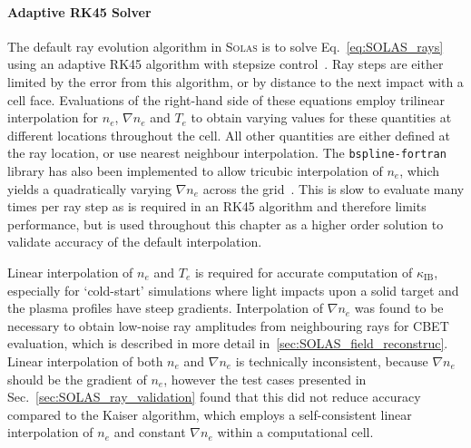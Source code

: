 \paragraph*{Adaptive RK45 Solver}
The default ray evolution algorithm in \textsc{Solas} is to solve Eq.~\ref{eq:SOLAS_rays} using an adaptive RK45 algorithm with stepsize control~\cite{press_numerical_2007}.
Ray steps are either limited by the error from this algorithm, or by distance to the next impact with a cell face.
Evaluations of the right-hand side of these equations employ trilinear interpolation for $n_e$, $\nabla n_e$ and $T_e$ to obtain varying values for these quantities at different locations throughout the cell.
All other quantities are either defined at the ray location, or use nearest neighbour interpolation.
The \texttt{bspline-fortran} library has also been implemented to allow tricubic interpolation of $n_e$, which yields a quadratically varying $\nabla n_e$ across the grid~\cite{williams_bspline-fortran_2024}.
This is slow to evaluate many times per ray step as is required in an RK45 algorithm and therefore limits performance, but is used throughout this chapter as a higher order solution to validate accuracy of the default interpolation.

Linear interpolation of $n_e$ and $T_e$ is required for accurate computation of $\kappa_{\text{IB}}$, especially for `cold-start' simulations where light impacts upon a solid target and the plasma profiles have steep gradients.
Interpolation of $\nabla n_e$ was found to be necessary to obtain low-noise ray amplitudes from neighbouring rays for \ac{CBET} evaluation, which is described in more detail in~\ref{sec:SOLAS_field_reconstruc}.
Linear interpolation of both $n_e$ and $\nabla n_e$ is technically inconsistent, because $\nabla n_e$ should be the gradient of $n_e$, however the test cases presented in Sec.~\ref{sec:SOLAS_ray_validation} found that this did not reduce accuracy compared to the Kaiser algorithm, which employs a self-consistent linear interpolation of $n_e$ and constant $\nabla n_e$ within a computational cell.

